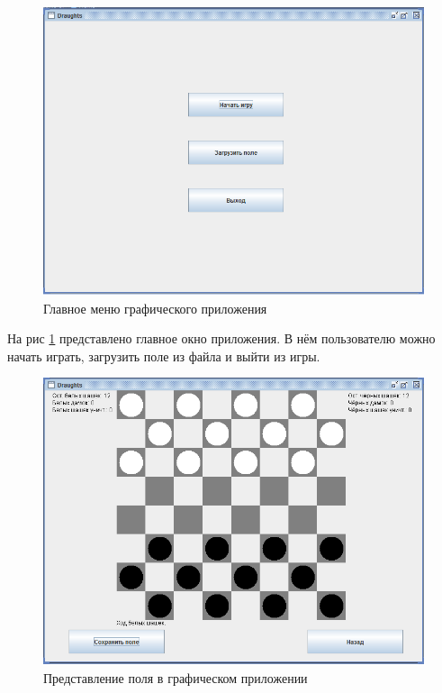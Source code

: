 \documentclass[a4paper]{article}
\begin{document}
\begin{figure}[H]
	\begin{center}
		\includegraphics[scale=0.5]{gui}
		\caption{Главное меню графического приложения} 
		\label{pic:graphicsMeinMenu} %
	\end{center}
\end{figure}

На рис \ref{pic:graphicsMeinMenu} представлено главное окно приложения. В нём пользователю можно начать играть, загрузить поле из файла и выйти из игры. 

\begin{figure}[H]
	\begin{center}
		\includegraphics[scale=0.5]{gui2}
		\caption{Представление поля в графическом приложении} 
		\label{pic:field} %
	\end{center}
\end{figure}
\end{document}

